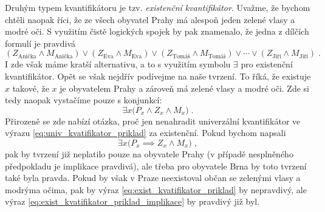 Druhým typem kvantifikátoru je tzv. \emph{existenční kvantifikátor}. Uvažme, že bychom chtěli naopak říci, že ze všech obyvatel Prahy má alespoň jeden zelené vlasy a modré oči. S využitím čistě logických spojek by pak znamenalo, že jedna z dílčích formulí je pravdivá
\begin{equation*}
    (Z_{\text{Anička}} \land M_{\text{Anička}}) \lor (Z_{\text{Eva}} \land M_{\text{Eva}}) \lor (Z_{\text{Tomáš}} \land M_{\text{Tomáš}}) \lor \cdots \lor (Z_{\text{Jiří}} \land M_{\text{Jiří}})\; .
\end{equation*}
I zde však máme kratší alternativu, a to s využitím symbolu $\exists$ pro existenční kvantifikátor. Opět se však nejdřív podívejme na naše tvrzení. To říká, že existuje $x$ takové, že $x$ je obyvatelem Prahy a zároveň má zelené vlasy a modré oči. Zde si tedy naopak vystačíme pouze s konjunkcí:
\begin{equation}\label{eq:exist_kvatifikator_priklad}
    \exists x \big(P_x \land Z_x \land M_x\big)\; .
\end{equation}
Přirozeně se zde nabízí otázka, proč jen nenahradit univerzální kvantifikátor ve výrazu \eqref{eq:univ_kvatifikator_priklad} za existenční. Pokud bychom napsali
\begin{equation}\label{eq:exist_kvatifikator_priklad_implikace}
    \exists x \big(P_x \implies Z_x \land M_x\big)\; ,
\end{equation}
pak by tvrzení již neplatilo pouze na obyvatele Prahy (v případě nesplněného předpokladu je implikace pravdivá), ale třeba pro obyvatele Brna by toto tvrzení také byla pravda. Pokud by však v Praze neexistoval občan se zelenými vlasy a modrýma očima, pak by výraz \eqref{eq:exist_kvatifikator_priklad} by nepravdivý, ale výraz \eqref{eq:exist_kvatifikator_priklad_implikace} by pravdivý již byl.\par



